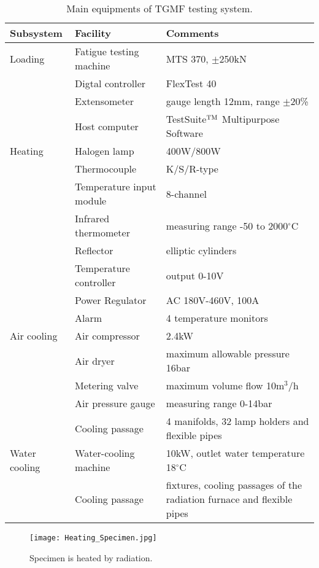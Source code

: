 \begin{table}[htbp]
  \centering
  \caption{Main equipments of TGMF testing system.}
    \begin{tabular}{p{3cm}p{4.5cm}p{6.5cm}}
    \toprule
    Subsystem & Facility & Comments \\
    \midrule
    Loading  & Fatigue testing machine & MTS 370, $\pm$250kN \\
          & Digtal controller & FlexTest 40 \\
          & Extensometer & gauge length 12mm, range $\pm$20\% \\
          & Host computer &  TestSuite$^{\rm TM}$ Multipurpose Software\\
    \midrule
    Heating & Halogen lamp & 400W/800W \\
          & Thermocouple & K/S/R-type \\
          & Temperature input module & 8-channel \\
          & Infrared thermometer & measuring range -50 to 2000$^\circ$C \\
          & Reflector & elliptic cylinders \\
          & Temperature controller & output 0-10V \\
          & Power Regulator & AC 180V-460V, 100A \\
          & Alarm & 4 temperature monitors \\
    \midrule
    Air cooling & Air compressor & 2.4kW \\
          & Air dryer & maximum allowable pressure 16bar \\
          & Metering valve & maximum volume flow 10m$^3$/h \\
          & Air pressure gauge & measuring range 0-14bar \\
          & Cooling passage & 4 manifolds, 32 lamp holders and flexible pipes \\
    \midrule
    Water cooling & Water-cooling machine & 10kW, outlet water temperature 18$^\circ$C \\
          & Cooling passage & fixtures, cooling passages of the radiation furnace and flexible pipes \\
    \bottomrule
    \end{tabular}%
  \label{Tab:TGMF_subsystem}%
\end{table}%

\begin{figure}[!htp]
	\centering
	\texttt{[image: Heating\_Specimen.jpg]}
	\caption{Specimen is heated by radiation.}
	\label{Fig:Heating_Specimen}
\end{figure}

